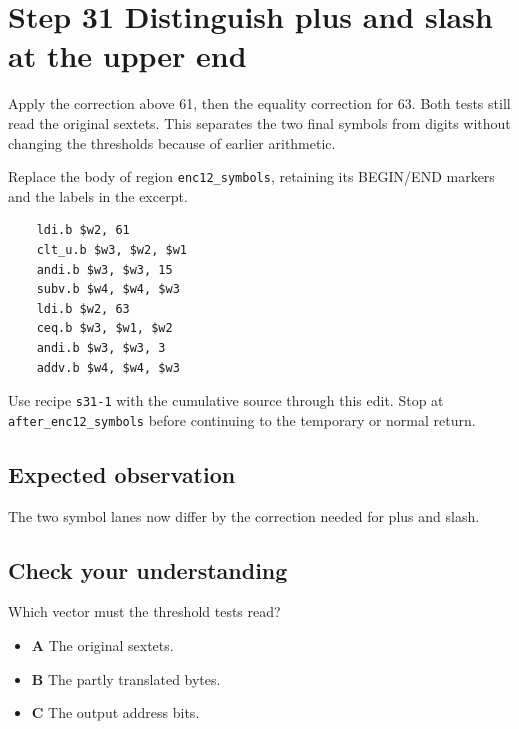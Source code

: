 \section{Step 31 Distinguish plus and slash at the upper end}\label{base64-s31}

Apply the correction above 61, then the equality correction for 63. Both tests still read the original sextets. This separates the two final symbols from digits without changing the thresholds because of earlier arithmetic.

Replace the body of region \texttt{enc12\_symbols}, retaining its BEGIN/END markers and the labels in the excerpt.

\begin{verbatim}
    ldi.b $w2, 61
    clt_u.b $w3, $w2, $w1
    andi.b $w3, $w3, 15
    subv.b $w4, $w4, $w3
    ldi.b $w2, 63
    ceq.b $w3, $w1, $w2
    andi.b $w3, $w3, 3
    addv.b $w4, $w4, $w3
\end{verbatim}

Use recipe \texttt{s31-1} with the cumulative source through this edit. Stop at \texttt{after\_enc12\_symbols} before continuing to the temporary or normal return.

\subsection{Expected observation}
The two symbol lanes now differ by the correction needed for plus and slash.

\subsection{Check your understanding}
Which vector must the threshold tests read?

\begin{itemize}
  \item \textbf{A} The original sextets.
  \item \textbf{B} The partly translated bytes.
  \item \textbf{C} The output address bits.
\end{itemize}
